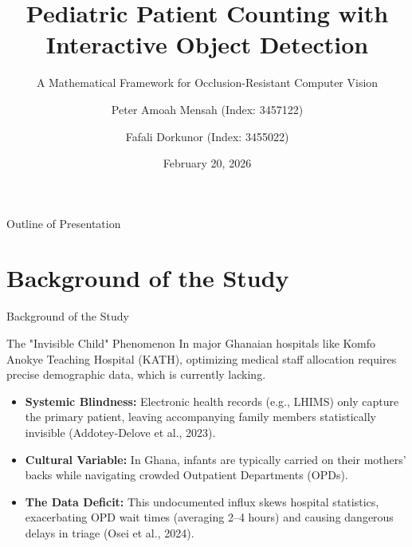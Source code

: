 \documentclass[11pt, aspectratio=169]{beamer}
\title[Pediatric Patient Counting]{Pediatric Patient Counting with Interactive Object Detection}
\subtitle{A Mathematical Framework for Occlusion-Resistant Computer Vision}
\author[Peter \& Fafali]{Peter Amoah Mensah (Index: 3457122) \and Fafali Dorkunor (Index: 3455022)}
\institute[KNUST]{
    Department of Mathematics \\
    Kwame Nkrumah University of Science and Technology
}
\date{February 20, 2026}
\begin{document}
\begin{frame}
    \titlepage
\end{frame}

\begin{frame}{Outline of Presentation}
    \tableofcontents
\end{frame}

\section{Background of the Study}
\begin{frame}{Background of the Study}
    \begin{block}{The "Invisible Child" Phenomenon}
        In major Ghanaian hospitals like Komfo Anokye Teaching Hospital (KATH), optimizing medical staff allocation requires precise demographic data, which is currently lacking.
    \end{block}
    
    \vspace{0.2cm}
    \begin{itemize}
        \item \textbf{Systemic Blindness:} Electronic health records (e.g., LHIMS) only capture the primary patient, leaving accompanying family members statistically invisible (Addotey-Delove et al., 2023).
        \item \textbf{Cultural Variable:} In Ghana, infants are typically carried on their mothers' backs while navigating crowded Outpatient Departments (OPDs).
        \item \textbf{The Data Deficit:} This undocumented influx skews hospital statistics, exacerbating OPD wait times (averaging 2--4 hours) and causing dangerous delays in triage (Osei et al., 2024).
    \end{itemize}
\end{frame}

\end{document}
